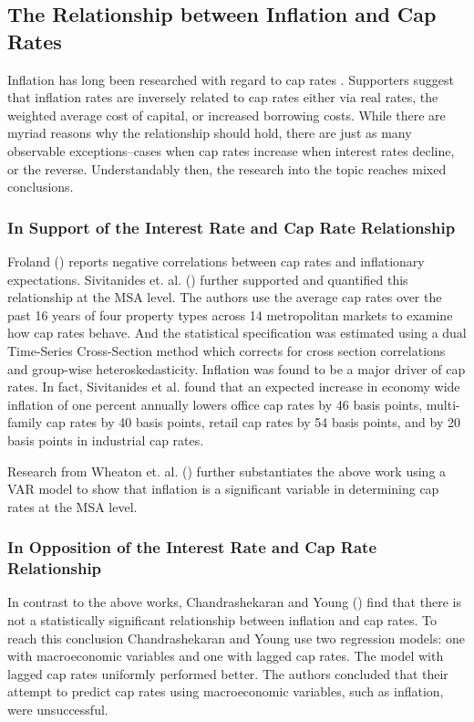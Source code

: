 \subsection{The Relationship between Inflation and Cap Rates}

Inflation has long been researched with regard to cap rates \citep*{froland1987determines, sivitanides2001determinants, chandrashekaran2000predictability}. Supporters suggest that inflation rates are inversely related to cap rates either via real rates, the weighted average  cost of capital, or increased borrowing costs. While there are myriad reasons why the relationship should hold, there are just as many observable exceptions--cases when cap rates increase when interest rates decline, or the reverse. Understandably then, the research into the topic reaches mixed conclusions.

\subsubsection{In Support of the Interest Rate and Cap Rate Relationship}
Froland (\citeyear{froland1987determines}) reports negative correlations between cap rates and inflationary expectations. Sivitanides et. al. (\citeyear{sivitanides2001determinants}) further supported and quantified this relationship at the MSA level. The authors use the average cap rates over the past 16 years of four property types across 14 metropolitan markets to examine how cap rates behave. And the statistical specification was estimated using a dual Time-Series Cross-Section method which corrects for cross section correlations and group-wise heteroskedasticity. Inflation was found to be a major driver of cap rates. In fact, Sivitanides et al. found that an expected increase in economy wide inflation of one percent annually lowers office cap rates by 46 basis points, multi-family cap rates by 40 basis points, retail cap rates by 54 basis points, and by 20 basis points in industrial cap rates.

Research from Wheaton et. al. (\citeyear{wheaton2001real}) further substantiates the above work using a VAR model to show that inflation is a significant variable in determining cap rates at the MSA level. 

\subsubsection{In Opposition of the Interest Rate and Cap Rate Relationship}
In contrast to the above works, Chandrashekaran and Young (\citeyear{chandrashekaran2000predictability}) find that there is not a statistically significant relationship between inflation and cap rates. To reach this conclusion Chandrashekaran and Young use two regression models: one with macroeconomic variables and one with lagged cap rates. The model with lagged cap rates uniformly performed better. The authors concluded that their attempt to predict cap rates using macroeconomic variables, such as inflation, were unsuccessful. 

